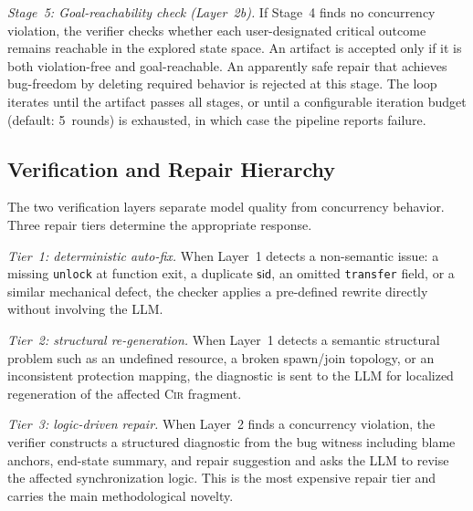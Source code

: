 \emph{Stage~5: Goal-reachability check (Layer~2b).}
If Stage~4 finds no concurrency violation, the verifier checks whether each user-designated critical outcome remains reachable in the explored state space. An artifact is accepted only if it is both violation-free and goal-reachable. An apparently safe repair that achieves bug-freedom by deleting required behavior is rejected at this stage. The loop iterates until the artifact passes all stages, or until a configurable iteration budget (default: 5~rounds) is exhausted, in which case the pipeline reports failure.

\subsection{Verification and Repair Hierarchy}
\label{subsec:repair-tier}
The two verification layers separate model quality from concurrency behavior. Three repair tiers determine the appropriate response.

\emph{Tier~1: deterministic auto-fix.}
When Layer~1 detects a non-semantic issue: a missing \texttt{unlock} at function exit, a duplicate $\mathsf{sid}$, an omitted \texttt{transfer} field, or a similar mechanical defect, the checker applies a pre-defined rewrite directly without involving the LLM.

\emph{Tier~2: structural re-generation.}
When Layer~1 detects a semantic structural problem such as an undefined resource, a broken spawn/join topology, or an inconsistent protection mapping, the diagnostic is sent to the LLM for localized regeneration of the affected \textsc{Cir} fragment.

\emph{Tier~3: logic-driven repair.}
When Layer~2 finds a concurrency violation, the verifier constructs a structured diagnostic from the bug witness including blame anchors, end-state summary, and repair suggestion and asks the
LLM to revise the affected synchronization logic. This is the most expensive repair tier and carries the main methodological novelty.

